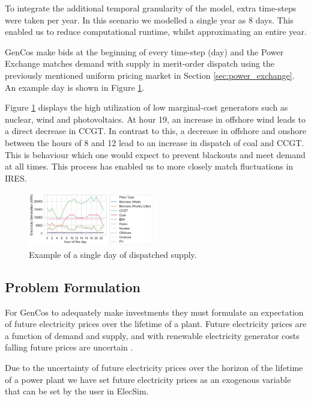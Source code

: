 \documentclass[final,3p,times,twocolumn,numbers]{elsarticle}
\begin{document}
To integrate the additional temporal granularity of the model, extra time-steps were taken per year. In this scenario we modelled a single year as 8 days. This enabled us to reduce computational runtime, whilst approximating an entire year.

GenCos make bids at the beginning of every time-step (day) and the Power Exchange matches demand with supply in merit-order dispatch using the previously mentioned uniform pricing market in Section \ref{sec:power_exchange}. An example day is shown in Figure \ref{fig:single_dispatched_day}. 

Figure \ref{fig:single_dispatched_day} displays the high utilization of low marginal-cost generators such as nuclear, wind and photovoltaics. At hour 19, an increase in offshore wind leads to a direct decrease in CCGT. In contrast to this, a decrease in offshore and onshore between the hours of 8 and 12 lead to an increase in dispatch of coal and CCGT. This is behaviour which one would expect to prevent blackouts and meet demand at all times. This process has enabled us to more closely match fluctuations in IRES.

\begin{figure}
\centering
\includegraphics[width=0.49\textwidth]{figures/methods_and_materials/clusters_results_single_day.pdf}
\caption{Example of a single day of dispatched supply.}
\label{fig:single_dispatched_day}
\end{figure}
 
\subsection{Problem Formulation}

For GenCos to adequately make investments they must formulate an expectation of future electricity prices over the lifetime of a plant. Future electricity prices are a function of demand and supply, and with renewable electricity generator costs falling future prices are uncertain \cite{IRENA2014}. 

Due to the uncertainty of future electricity prices over the horizon of the lifetime of a power plant we have set future electricity prices as an exogenous variable that can be set by the user in ElecSim.
\end{document}
